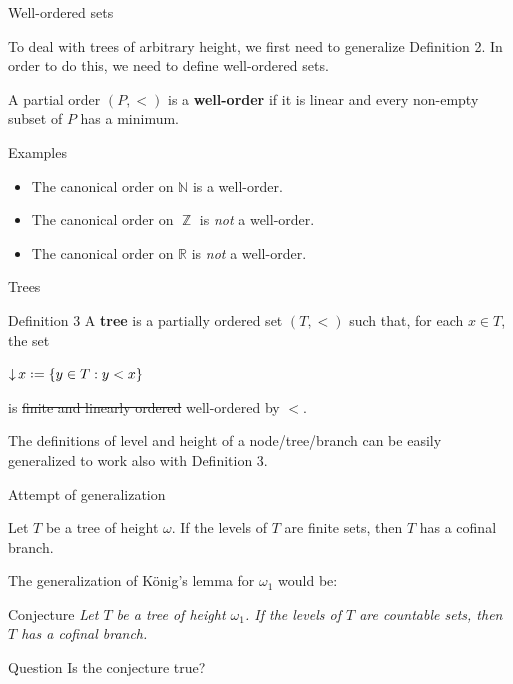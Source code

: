 \documentclass{beamer}
\theoremstyle{num.custom-title}
\theoremstyle{custom-title}
\DeclareMathOperator{\Z}{\mathbb{Z}}
\DeclareMathOperator{\down}{\downarrow}
\newcommand{\N}{\mathbb{N}}
\newcommand{\R}{\mathbb{R}}
\newcommand*{\defeq}{\mathrel{\rlap{%
                     \raisebox{0.3ex}{$\cdot$}}%
                     \raisebox{-0.3ex}{$\cdot$}}%
                     =}
\renewcommand{\emph}[1]{\textbf{#1}}
\begin{document}
\begin{frame}{Well-ordered sets}

To deal with trees of arbitrary height, we first need to generalize Definition 2. In order to do this, we need to define well-ordered sets.

\begin{definition}
A partial order $(P,<)$ is a \emph{well-order} if it is linear and every non-empty subset of $P$ has a minimum.
\end{definition}

\pause

\begin{exampleblock}{Examples}
\begin{itemize}
\item The canonical order on $\N$ is a well-order. 
\item The canonical order on $\Z$ is \textit{not} a well-order.
\item The canonical order on $\R$ is \textit{not} a well-order.
\end{itemize}
\end{exampleblock}

\end{frame}


\begin{frame}{Trees}

\begin{block}{Definition 3}
A \emph{tree} is a partially ordered set $(T,<)$ such that, for each $x \in T$, the set
\begin{center}
$\down x \defeq \{y \in T : y < x\}$
\end{center}
is \sout{finite and linearly ordered} well-ordered by $<$.
\end{block}

\pause

The definitions of level and height of a node/tree/branch can be easily generalized to work also with Definition 3.
\end{frame}


\begin{frame}{Attempt of generalization}

\begin{lemma}[König, 1927]
Let $T$ be a tree of height $\omega$. If the levels of $T$ are finite sets, then $T$ has a cofinal branch.
\end{lemma}

The generalization of König's lemma for $\omega_1$ would be:

\pause

\begin{block}{Conjecture}
\textit{Let $T$ be a tree of height $\omega_1$. If the levels of $T$ are countable sets, then $T$ has a cofinal branch.}
\end{block}

\pause

\begin{exampleblock}{Question}
Is the conjecture true?
\end{exampleblock}

\end{frame}
\end{document}
